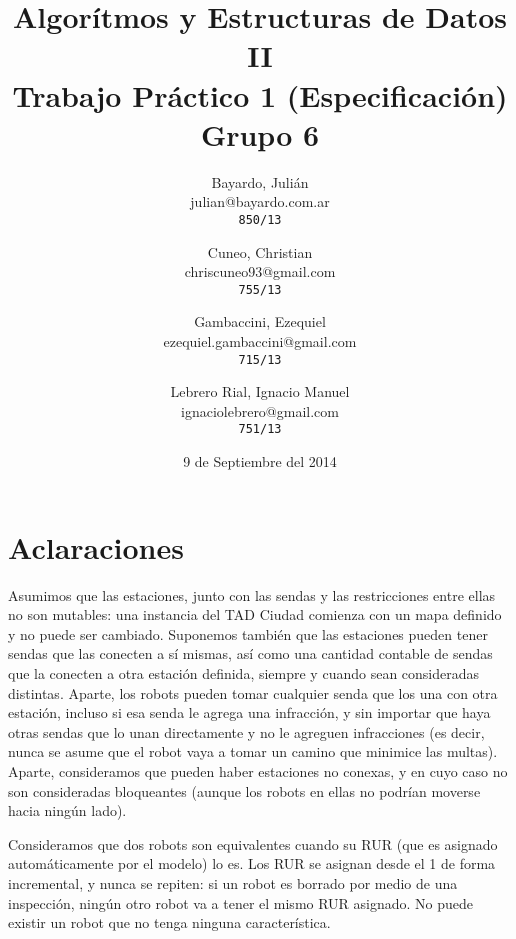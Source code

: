 \documentclass[a4paper,titlepage]{article}
\begin{document}
\title{Algorítmos y Estructuras de Datos II\\
Trabajo Práctico 1 (Especificación)\\
Grupo 6}

\author{
	Bayardo, Julián\\
	julian@bayardo.com.ar\\
	\texttt{850/13}
	\and
	Cuneo, Christian\\
	chriscuneo93@gmail.com\\
	\texttt{755/13}
	\and
	Gambaccini, Ezequiel\\
	ezequiel.gambaccini@gmail.com\\
	\texttt{715/13}
	\and
	Lebrero Rial, Ignacio Manuel\\
	ignaciolebrero@gmail.com\\
	\texttt{751/13}
}

\date{9 de Septiembre del 2014}

\maketitle

\section{Aclaraciones}

Asumimos que las estaciones, junto con las sendas y las restricciones entre ellas no son mutables: una instancia del TAD Ciudad comienza con un mapa definido y no puede ser cambiado. Suponemos también que las estaciones pueden tener sendas que las conecten a sí mismas, así como una cantidad contable de sendas que la conecten a otra estación definida, siempre y cuando sean consideradas distintas. Aparte, los robots pueden tomar cualquier senda que los una con otra estación, incluso si esa senda le agrega una infracción, y sin importar que haya otras sendas que lo unan directamente y no le agreguen infracciones (es decir, nunca se asume que el robot vaya a tomar un camino que minimice las multas). Aparte, consideramos que pueden haber estaciones no conexas, y en cuyo caso no son consideradas bloqueantes (aunque los robots en ellas no podrían moverse hacia ningún lado).

Consideramos que dos robots son equivalentes cuando su RUR (que es asignado automáticamente por el modelo) lo es. Los RUR se asignan desde el 1 de forma incremental, y nunca se repiten: si un robot es borrado por medio de una inspección, ningún otro robot va a tener el mismo RUR asignado. No puede existir un robot que no tenga ninguna característica.
\end{document}
